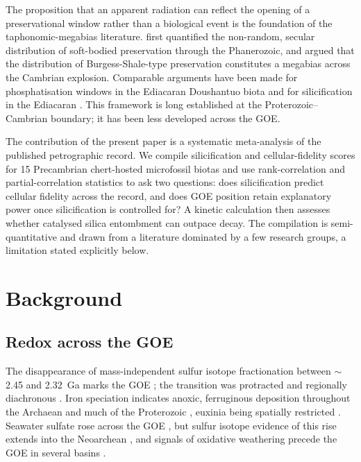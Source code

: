 \documentclass[11pt]{article}
\begin{document}
The proposition that an apparent radiation can reflect the opening of a preservational window rather
than a biological event is the foundation of the taphonomic-megabias literature. \citet{Allison1993}
first quantified the non-random, secular distribution of soft-bodied preservation through the
Phanerozoic, and \citet{Butterfield2003} argued that the distribution of Burgess-Shale-type
preservation constitutes a megabias across the Cambrian explosion. Comparable arguments have been
made for phosphatisation windows in the Ediacaran Doushantuo biota and for silicification in the
Ediacaran \citep{Tarhan2016}. This framework is long established at the Proterozoic--Cambrian
boundary; it has been less developed across the GOE.

The contribution of the present paper is a systematic meta-analysis of the published petrographic
record. We compile silicification and cellular-fidelity scores for 15 Precambrian chert-hosted
microfossil biotas and use rank-correlation and partial-correlation statistics to ask two questions:
does silicification predict cellular fidelity across the record, and does GOE position retain
explanatory power once silicification is controlled for? A kinetic calculation then assesses whether
catalysed silica entombment can outpace decay. The compilation is semi-quantitative and drawn from a
literature dominated by a few research groups, a limitation stated explicitly below.

\section{Background}

\subsection{Redox across the GOE}

The disappearance of mass-independent sulfur isotope fractionation between $\sim$2.45 and 2.32~Ga
marks the GOE \citep{Holland2006,Bekker2004,Pavlov2002,Farquhar2000}; the transition was protracted
and regionally diachronous \citep{Lyons2014,Philippot2018}. Iron speciation indicates anoxic,
ferruginous deposition throughout the Archaean and much of the Proterozoic
\citep{Canfield1998,Poulton2005,Poulton2011}, euxinia being spatially restricted
\citep{Reinhard2009}. Seawater sulfate rose across the GOE \citep{Habicht2002,Kah2004,Crowe2014},
but sulfur isotope evidence of this rise extends into the Neoarchean \citep{Reinhard2009}, and
signals of oxidative weathering precede the GOE in several basins \citep{Anbar2007}.
\end{document}
